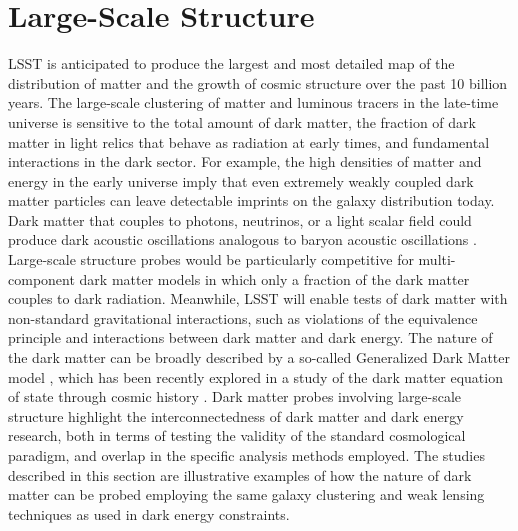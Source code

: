 \section{Large-Scale Structure }
\label{sec:lss}

LSST is anticipated to produce the largest and most detailed map of the distribution of matter and the growth of cosmic structure over the past 10 billion years. The large-scale clustering of matter and luminous tracers in the late-time universe is sensitive to the total amount of dark matter, the fraction of dark matter in light relics that behave as radiation at early times, and fundamental interactions in the dark sector. For example, the high densities of matter and energy in the early universe imply that even extremely weakly coupled dark matter particles can leave detectable imprints on the galaxy distribution today. Dark matter that couples to photons, neutrinos, or a light scalar field could produce dark acoustic oscillations analogous to baryon acoustic oscillations \citep{Cyr-Racine:2014}. Large-scale structure probes would be particularly competitive for multi-component dark matter models in which only a fraction of the dark matter couples to dark radiation. Meanwhile, LSST will enable tests of dark matter with non-standard gravitational interactions, such as violations of the equivalence principle \citep{Bonvin:2018} and interactions between dark matter and dark energy. The nature of the dark matter can be broadly described by a so-called Generalized Dark Matter model \citep{Hu:1998}, which has been recently explored in a study of the dark matter equation of state through cosmic history \citep{Kopp:2018}. 
Dark matter probes involving large-scale structure highlight the interconnectedness of dark matter and dark energy research, both in terms of testing the validity of the standard cosmological paradigm, and overlap in the specific analysis methods employed. The studies described in this section are illustrative examples of how the nature of dark matter can be probed employing the same galaxy clustering and weak lensing techniques as used in dark energy constraints. 

